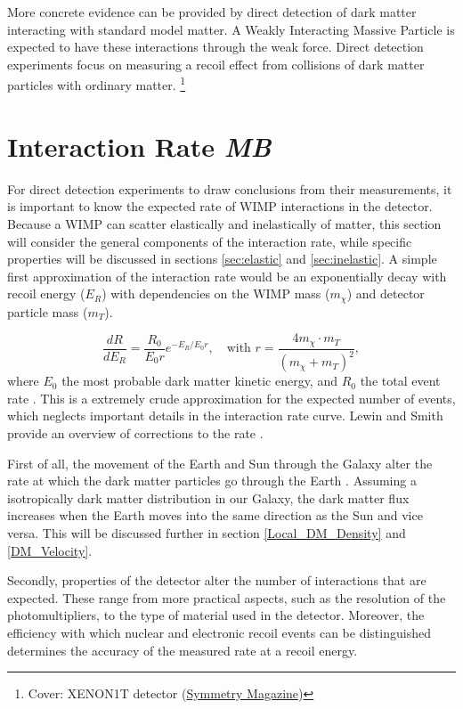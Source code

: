 \documentclass{article}
\newcommand\blfootnote[1]{%
  \begingroup
  \renewcommand\thefootnote{}\footnote{#1}%
  \addtocounter{footnote}{-1}%
  \endgroup
}
\begin{document}
More concrete evidence can be provided by direct detection of dark matter interacting with standard model matter. A Weakly Interacting Massive Particle is expected to have these interactions through the weak force. Direct detection experiments focus on measuring a recoil effect from collisions of dark matter particles with ordinary matter.\blfootnote{\noindent Cover: XENON1T detector (\href{https://www.symmetrymagazine.org/article/dark-matters-newest-pursuer}{Symmetry Magazine})}

\FloatBarrier
\newpage
\section{Interaction Rate \small{\textit{MB}}}

For direct detection experiments to draw conclusions from their measurements, it is important to know the expected rate of WIMP interactions in the detector. Because a WIMP can scatter elastically and inelastically of matter, this section will consider the general components of the interaction rate, while specific properties will be discussed in sections \ref{sec:elastic} and \ref{sec:inelastic}. A simple first approximation of the interaction rate would be an exponentially decay with recoil energy ($E_R$) with dependencies on the WIMP mass ($m_\chi$) and detector particle mass ($m_T$). 

\begin{equation}
    \frac{dR}{dE_R} = \frac{R_0}{E_0 r} e^{-E_R/E_0r}, \quad \mbox{with } r = \frac{4m_{\chi} \cdot m_T}{(m_{\chi} + m_T)^2}, 
\end{equation}
where $E_0$ the most probable dark matter kinetic energy, and $R_0$ the total event rate \cite{Lewin:1995rx}. This is a extremely crude approximation for the expected number of events, which neglects important details in the interaction rate curve. Lewin and Smith provide an overview of corrections to the rate \cite{Lewin:1995rx}. 

First of all, the movement of the Earth and Sun through the Galaxy alter the rate at which the dark matter particles go through the Earth \cite{Spergel:1987kx}. Assuming a isotropically dark matter distribution in our Galaxy, the dark matter flux increases when the Earth moves into the same direction as the Sun and vice versa. This will be discussed further in section \ref{Local_DM_Density} and \ref{DM_Velocity}.

Secondly, properties of the detector alter the number of interactions that are expected. These range from more practical aspects, such as the resolution of the photomultipliers, to the type of material used in the detector. Moreover, the efficiency with which nuclear and electronic recoil events can be distinguished determines the accuracy of the measured rate at a recoil energy.
\end{document}
